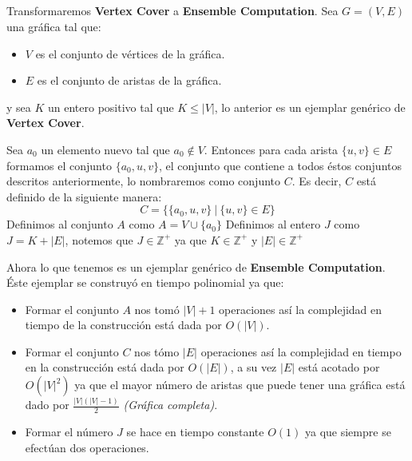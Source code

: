 \documentclass[spanish, xcolor=dvipsnames, aspectratio=169]{beamer}
\newcommand{\subsectiontitle}{}
\begin{document}
\subsection{\subsectiontitle}
\begin{frame}{\subsectiontitle}
Transformaremos \textbf{Vertex Cover} a \textbf{Ensemble Computation}.
\newline 
Sea \(G = \left(V, E\right)\) una gráfica tal que:
\begin{itemize}
    \item \(V\) es el conjunto de vértices de la gráfica.
    \item \(E\) es el conjunto de aristas de la gráfica.
\end{itemize}
y sea \(K\) un entero positivo tal que \(K \leq |V|\), lo anterior es un ejemplar genérico de \textbf{Vertex Cover}.
\end{frame}
\begin{frame}{\subsectiontitle}
    Sea \(a_{0}\) un elemento nuevo tal que \(a_{0} \notin V\). Entonces para cada arista \(\{u, v\} \in E\) formamos el conjunto 
    \(\{a_{0}, u, v\}\), el conjunto que contiene a todos éstos conjuntos descritos anteriormente, lo nombraremos como conjunto \(C\).
    Es decir, \(C\) está definido de la siguiente manera:
    \[
        C = \{ \{a_{0}, u, v\} \ | \ \{u, v\} \in E\} 
    \]
    Definimos al conjunto \(A\) como \(A = V \cup \{a_0\}\)
    \newline
    Definimos al entero \(J\) como \(J = K + |E|\), notemos que \(J \in \mathbb{Z}^{+}\) ya que \(K \in \mathbb{Z}^{+}\) y \(|E| \in \mathbb{Z}^{+}\)
\end{frame}
\begin{frame}{\subsectiontitle}
    Ahora lo que tenemos es un ejemplar genérico de \textbf{Ensemble Computation}. Éste ejemplar se construyó en tiempo polinomial ya que:
    \begin{itemize}
        \item Formar el conjunto \(A\) nos tomó \(|V| + 1\) operaciones así la complejidad en tiempo de la construcción está dada por \(O\left(|V|\right)\).
        \item Formar el conjunto \(C\) nos tómo \(|E|\) operaciones así la complejidad en tiempo en la construcción está dada por \(O\left(|E|\right)\), a su vez
        \(|E|\) está acotado por  \(O\left(|V|^2\right)\) ya que el mayor número de aristas que puede tener una gráfica está dado por \(\frac{|V|\left(|V| - 1\right)}{2}\)
        \textit{(Gráfica completa)}.
        \item Formar el número \(J\) se hace en tiempo constante \(O\left(1\right)\) ya que siempre se efectúan dos operaciones.
    \end{itemize}
\end{frame}
\end{document}
